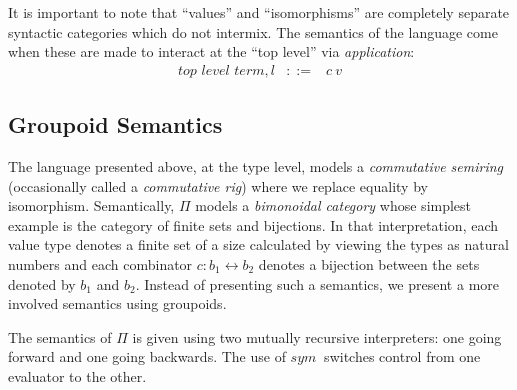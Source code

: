 \documentclass[11pt]{article}
\newcommand{\iso}{\leftrightarrow}
\newcommand{\symc}[1]{\mathit{sym}~#1}
\begin{document}
It is important to note that ``values'' and ``isomorphisms'' are completely
separate syntactic categories which do not intermix. The semantics of the
language come when these are made to interact at the ``top level'' via
\emph{application}: 
\[\begin{array}{lrcl}
\textit{top level term}, l &::=& c~v
\end{array}\]

\subsection{Groupoid Semantics}

The language presented above, at the type level, models a \emph{commutative
  semiring} (occasionally called a \emph{commutative rig}) where we replace
equality by isomorphism.  Semantically, $\Pi$ models a \emph{bimonoidal
  category} whose simplest example is the category of finite sets and
bijections. In that interpretation, each value type denotes a finite set of a
size calculated by viewing the types as natural numbers and each combinator
$c : b_1 \iso b_2$ denotes a bijection between the sets denoted by $b_1$ and
$b_2$. Instead of presenting such a semantics, we present a more involved
semantics using groupoids. 

The semantics of $\Pi$ is given using two mutually recursive interpreters:
one going forward and one going backwards. The use of $\symc{}$ switches
control from one evaluator to the other.
\end{document}
